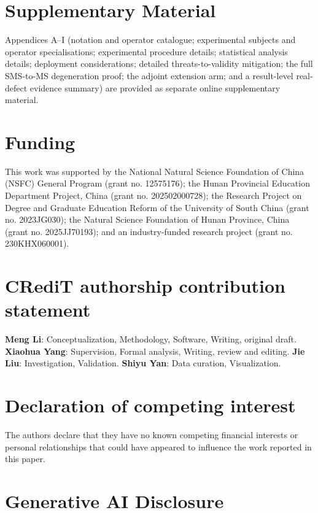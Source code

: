 \documentclass[manuscript,screen,review]{acmart}
\begin{document}


\section*{Supplementary Material}

Appendices A--I (notation and operator catalogue; experimental subjects and
operator specialisations; experimental procedure details; statistical analysis
details; deployment considerations; detailed threats-to-validity mitigation;
the full SMS-to-MS degeneration proof; the adjoint extension arm; and a
result-level real-defect evidence summary) are provided as separate online
supplementary material.

\section*{Funding}

This work was supported by the National Natural Science Foundation of China
(NSFC) General Program (grant no. 12575176); the Hunan Provincial Education
Department Project, China (grant no. 202502000728); the Research Project on
Degree and Graduate Education Reform of the University of South China (grant
no. 2023JG030); the Natural Science Foundation of Hunan Province, China (grant
no. 2025JJ70193); and an industry-funded research project (grant no.
230KHX060001).

\section*{CRediT authorship contribution statement}

\textbf{Meng Li}: Conceptualization, Methodology, Software, Writing, original
draft. \textbf{Xiaohua Yang}: Supervision, Formal analysis, Writing, review
and editing. \textbf{Jie Liu}: Investigation, Validation. \textbf{Shiyu Yan}:
Data curation, Visualization.

\section*{Declaration of competing interest}

The authors declare that they have no known competing financial interests or
personal relationships that could have appeared to influence the work reported
in this paper.

\section*{Generative AI Disclosure}
\end{document}
